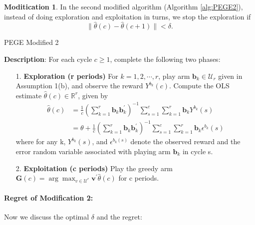 \documentclass{article}
\theoremstyle{plain}
\theoremstyle{definition}
\newtheorem{modification}{Moditication}
\begin{document}

\begin{modification}
In the second modified algorithm (Algorithm \ref{alg:PEGE2}), instead of doing exploration and exploitation in turns, we stop the exploration if
\begin{equation}
\|\hat{\theta}(c)-\hat{\theta}(c+1)\|<\delta .\nonumber 
\end{equation}




\begin{algorithm}\label{alg:PEGE2}
\caption{PEGE Modified 2}
\textbf{Description}: For each cycle $c\geq 1$, complete the following two phases:
\begin{itemize}
\item [1. ] \textbf{Exploration (r periods)} For $k=1,2,\cdots,r$, play arm $\textbf{b}_{k}\in \mathcal{U}_{r}$ given in Assumption 1(b), and observe the reward $Y^{b_{k}}(c)$. Compute the OLS estimate $\hat{\theta}(c)\in \mathbb{R}^{r}$, given by
\begin{align}
\hat{\theta}(c)&=\frac{1}{c}(\sum_{k=1}^{r}\textbf{b}_{k}\textbf{b}_{k}^{'})^{-1}\sum_{s=1}^{c}\sum_{k=1}^{r}\textbf{b}_{k}Y^{b_{k}}(s) \nonumber \\
&=\theta+\frac{1}{c}(\sum_{k=1}^{r}\textbf{b}_{k}\textbf{b}_{k}^{'})^{-1}\sum_{s=1}^{c}\sum_{k=1}^{r}\textbf{b}_{k}\epsilon^{b_{k}}(s) \nonumber 
\end{align}
where for any k, $Y^{b_{k}}(s)$, and $\epsilon^{b_{k}(s)}$ denote the observed reward and the error random variable associated with playing arm $\textbf{b}_{k}$ in cycle s.
\item [2. ] \textbf{Exploitation (c periods)} Play the greedy arm $\textbf{G}(c)=\arg \max_{v\in \mathcal{U}^{r}}\textbf{v}^{'}\hat{\theta}(c)$ for c periods.
\end{itemize}

\end{algorithm}


\paragraph{Regret of Modification 2:}
Now we discuss the optimal $\delta$ and the regret:


\end{modification}
\end{document}
